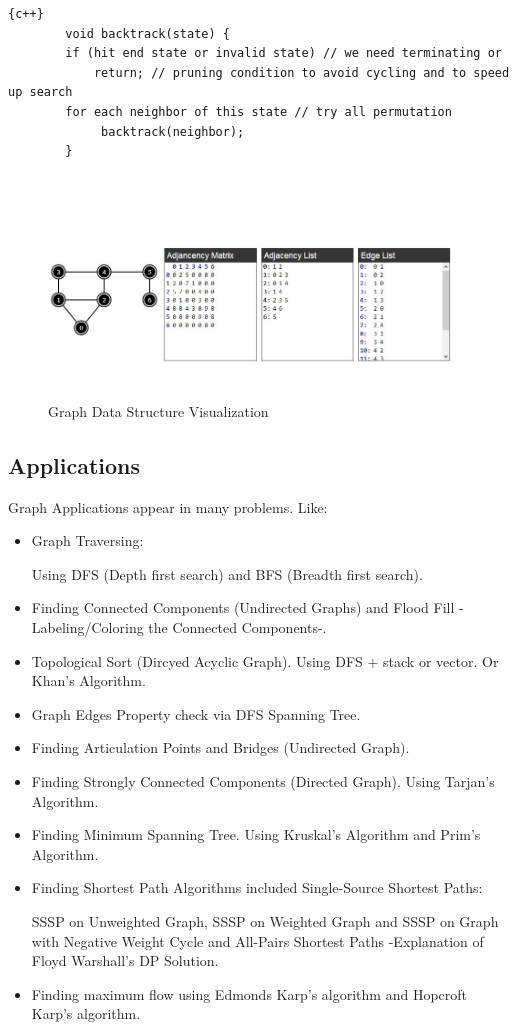 \begin{lstlisting}{c++}
        void backtrack(state) {
        if (hit end state or invalid state) // we need terminating or
            return; // pruning condition to avoid cycling and to speed up search
        for each neighbor of this state // try all permutation
             backtrack(neighbor);
        }
\end{lstlisting}
\\
\newline
\begin{figure}[h]
\includegraphics[width=15cm, height=5cm]{GraphRepresentation.png}
 \caption{Graph Data Structure Visualization}
    \label{fig:GraphRepresentation}
\end{figure}


\subsection{Applications}
Graph Applications appear in many problems. Like:
\begin{itemize}
\item Graph Traversing: 

Using DFS (Depth first search) and BFS (Breadth first search).
\item Finding Connected Components (Undirected Graphs) and Flood Fill -Labeling/Coloring the Connected Components-.
\item Topological Sort (Dircyed Acyclic Graph). Using DFS + stack or vector. Or Khan's Algorithm.
\item Graph Edges Property check via DFS Spanning Tree.
\item Finding Articulation Points and Bridges (Undirected Graph). \item Finding Strongly Connected Components (Directed Graph). Using Tarjan's Algorithm.
\item Finding Minimum Spanning Tree. Using Kruskal’s Algorithm and Prim’s Algorithm.
\item Finding Shortest Path Algorithms included Single-Source Shortest Paths:

SSSP on Unweighted Graph, SSSP on Weighted Graph and SSSP on Graph with Negative Weight Cycle and All-Pairs Shortest Paths -Explanation of Floyd Warshall’s DP Solution. 
\item Finding maximum flow using Edmonds Karp’s algorithm and Hopcroft Karp’s algorithm.
\end{itemize}

